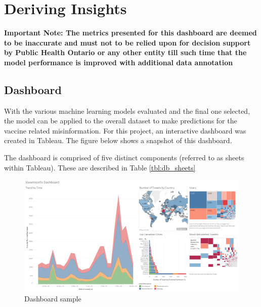 \documentclass[12pt]{article}
\begin{document}
\newpage

\section{Deriving Insights}
\textbf{Important Note: The metrics presented for this dashboard are deemed to be inaccurate and must not to be relied upon for decision support by Public Health Ontario or any other entity till such time that the model performance is improved with additional data annotation}
\subsection{Dashboard}
With the various machine learning models evaluated and the final one selected, the model can be applied to the overall dataset to make predictions for the vaccine related misinformation. For this project, an interactive dashboard was created in Tableau. The figure below shows a snapshot of this dashboard. 


The dashboard is comprised of five distinct components (referred to as sheets within Tableau). These are described in Table \ref{tbl:db_sheets} 

\begin{figure}[tbp]
\centering 
\includegraphics[width=1\textwidth]{figures/db_sample}
\caption{Dashboard sample} 
\label{fig:db_sample}
\end{figure}
\end{document}
